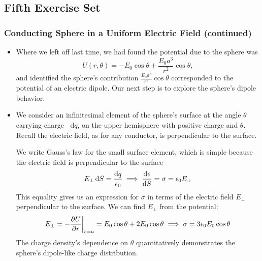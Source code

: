 \documentclass[11pt, a4paper]{article}
\newcommand{\diff}{\mathop{}\!\mathrm{d}} %
\newcommand{\e}{\epsilon_{0}}  %
\begin{document}
\subsection{Fifth Exercise Set}

\subsubsection{Conducting Sphere in a Uniform Electric Field (continued)}
\begin{itemize}
	\item Where we left off last time, we had found the potential due to the sphere was
	\begin{equation*}
		U(r, \theta) = - E_{0} \cos \theta + \frac{E_{0}a^{3}}{r^{2}}\cos \theta,
	\end{equation*}
	and identified the sphere's contribution $ \frac{E_{0}a^{3}}{r^{2}}\cos \theta $ corresponded to the potential of an electric dipole. Our next step is to explore the sphere's dipole behavior.
	
	\item We consider an infinitesimal element of the sphere's surface at the angle $ \theta $ carrying charge $ \diff q $, on the upper hemisphere with positive charge and $ \theta $. Recall the electric field, as for any conductor, is perpendicular to the surface. 
	
	We write Gauss's law for the small surface element, which is simple because the electric field is perpendicular to the surface
	\begin{equation*}
		E_{\perp} \diff S = \frac{\diff q}{\e} \implies \dv{e}{S} = \sigma = \e E_{\perp}
	\end{equation*}
	This equality gives us an expression for $ \sigma $ in terms of the electric field $ E_{\perp} $ perpendicular to the surface. We can find $ E_{\perp} $ from the potential:
	\begin{equation*}
		E_{\perp} = -\pdv{U}{r}\bigg |_{r = a} = E_{0}\cos \theta + 2E_{0}\cos \theta \implies \sigma = 3\e E_{0} \cos \theta
	\end{equation*}
	The charge density's dependence on $ \theta $ quantitatively demonstrates the sphere's dipole-like charge distribution. 
	

\end{itemize}
\end{document}
